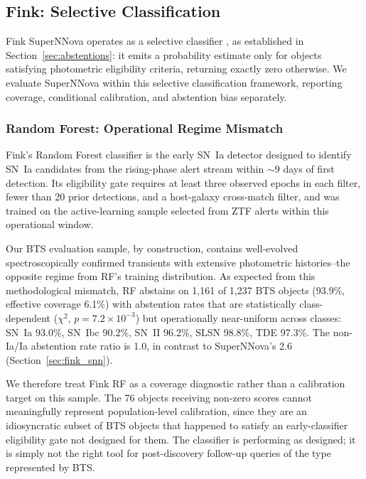 \documentclass[a4paper,fleqn,usenatbib]{mnras}
\begin{document}
\subsection{Fink: Selective Classification} \label{sec:fink}

Fink SuperNNova operates as a selective classifier \citep{geifman2017},
as established in Section~\ref{sec:abstentions}: it emits a probability
estimate only for objects satisfying photometric eligibility criteria,
returning exactly zero otherwise. We evaluate SuperNNova within this
selective classification framework, reporting coverage, conditional
calibration, and abstention bias separately.

\subsubsection{Random Forest: Operational Regime Mismatch} \label{sec:fink_rf}

Fink's Random Forest classifier \citep{leoni2022} is the early SN~Ia detector designed to identify SN~Ia candidates from the rising-phase alert stream within $\sim$9 days of first detection. Its eligibility gate requires at least three observed epochs in each filter, fewer than 20 prior detections, and a host-galaxy cross-match filter, and was trained on the active-learning sample selected from ZTF alerts within this operational window.

Our BTS evaluation sample, by construction, contains well-evolved spectroscopically confirmed transients with extensive photometric histories--the opposite regime from RF's training distribution. As expected from this methodological mismatch, RF abstains on 1,161 of 1,237 BTS objects (93.9\%, effective coverage 6.1\%) with abstention rates that are statistically class-dependent ($\chi^2$, $p = 7.2 \times 10^{-3}$) but operationally near-uniform across classes: SN~Ia 93.0\%, SN~Ibc 90.2\%, SN~II 96.2\%, SLSN 98.8\%, TDE 97.3\%. The non-Ia/Ia abstention rate ratio is 1.0, in contrast to SuperNNova's 2.6 (Section~\ref{sec:fink_snn}).

We therefore treat Fink RF as a coverage diagnostic rather than a calibration target on this sample. The 76 objects receiving non-zero scores cannot meaningfully represent population-level calibration, since they are an idiosyncratic subset of BTS objects that happened to satisfy an early-classifier eligibility gate not designed for them. The classifier is performing as designed; it is simply not the right tool for post-discovery follow-up queries of the type represented by BTS.
\end{document}
